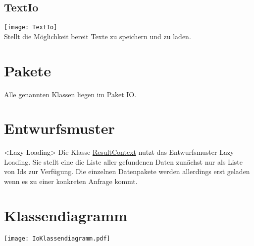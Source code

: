 \subsection{TextIo}\label{IO:TextIo}
\texttt{[image: TextIo]}\\
Stellt die Möglichkeit bereit Texte zu speichern und zu laden.
\beginMembers
{}
\closeMembers

\section{Pakete}
Alle genannten Klassen liegen im Paket IO.
\newpage
\section{Entwurfsmuster}
<Lazy Loading>
Die Klasse \hyperref[IO:ResultContext]{ResultContext} nutzt das Entwurfsmuster Lazy Loading. Sie stellt eine die Liste aller gefundenen Daten zunächst nur als Liste von Ids zur Verfügung. Die einzelnen Datenpakete werden allerdings erst geladen wenn es zu einer konkreten Anfrage kommt.

\section{Klassendiagramm}
\texttt{[image: IoKlassendiagramm.pdf]}
